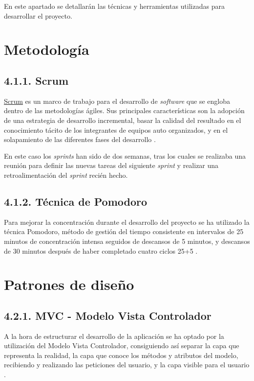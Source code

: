 
En este apartado se detallarán las técnicas y herramientas utilizadas para desarrollar el proyecto.

\section{Metodología}

\subsection{4.1.1. Scrum}

\href{https://proyectosagiles.org/que-es-scrum/}{Scrum} es un marco de trabajo para el desarrollo de \textit{software} que se engloba dentro de las metodologías ágiles. Sus principales características son la adopción de una estrategia de desarrollo incremental, basar la calidad del resultado en el conocimiento tácito de los integrantes de equipos auto organizados, y en el solapamiento de las diferentes fases del desarrollo \cite{10web:scrum}.

En este caso los \textit{sprints} han sido de dos semanas, tras los cuales se realizaba una reunión para definir las nuevas tareas del siguiente \textit{sprint} y realizar una retroalimentación del \textit{sprint} recién hecho.

\subsection{4.1.2. Técnica de Pomodoro}

Para mejorar la concentración durante el desarrollo del proyecto se ha utilizado la técnica Pomodoro, método de gestión del tiempo consistente en intervalos de 25 minutos de concentración intensa seguidos de descansos de 5 minutos, y descansos de 30 minutos después de haber completado cuatro ciclos 25+5 \cite{web:pomodoro}.

\section{Patrones de diseño}

\subsection{4.2.1. MVC - Modelo Vista Controlador}

A la hora de estructurar el desarrollo de la aplicación se ha optado por la utilización del Modelo Vista Controlador, consiguiendo así separar la capa que representa la realidad, la capa que conoce los métodos y atributos del modelo, recibiendo y realizando las peticiones del usuario, y la capa visible para el usuario \cite{web:patronDis}.

